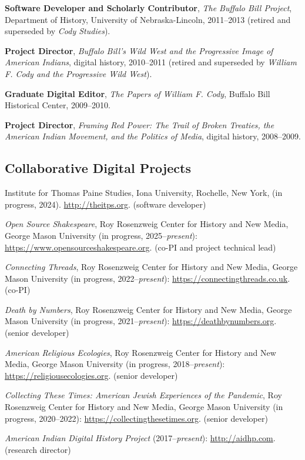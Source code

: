 \documentclass[10pt]{article}
\begin{document}
\textbf{Software Developer and Scholarly Contributor}, \textit{The Buffalo Bill Project}, Department of History, University of Nebraska-Lincoln, 2011--2013 (retired and superseded by \textit{Cody Studies}).

\textbf{Project Director}, \textit{Buffalo Bill's Wild West and the Progressive Image of American Indians}, digital history, 2010--2011 (retired and superseded by \textit{William F. Cody and the Progressive Wild West}).

\textbf{Graduate Digital Editor}, \textit{The Papers of William F. Cody}, Buffalo Bill Historical Center, 2009--2010.

\textbf{Project Director}, \textit{Framing Red Power: The Trail of Broken Treaties, the American Indian Movement, and the Politics of Media}, digital history, 2008--2009.

\subsection{Collaborative Digital Projects}

Institute for Thomas Paine Studies, Iona University, Rochelle, New York, (in progress, 2024). \url{http://theitps.org}. (software developer)

\textit{Open Source Shakespeare}, Roy Rosenzweig Center for History and New Media, George Mason University (in progress, 2025--\textit{present}): \url{https://www.opensourceshakespeare.org}. (co-PI and project technical lead)

\textit{Connecting Threads}, Roy Rosenzweig Center for History and New Media, George Mason University (in progress, 2022--\textit{present}): \url{https://connectingthreads.co.uk}. (co-PI)

\textit{Death by Numbers}, Roy Rosenzweig Center for History and New Media, George Mason University (in progress, 2021--\textit{present}): \url{https://deathbynumbers.org}. (senior developer)

\textit{American Religious Ecologies}, Roy Rosenzweig Center for History and New Media, George Mason University (in progress, 2018--\textit{present}): \url{https://religiousecologies.org}. (senior developer)

\textit{Collecting These Times: American Jewish Experiences of the Pandemic}, Roy Rosenzweig Center for History and New Media, George Mason University (in progress, 2020--2022): \url{https://collectingthesetimes.org}. (senior developer)

\textit{American Indian Digital History Project} (2017--\textit{present}): \url{http://aidhp.com}. (research director)
\end{document}
